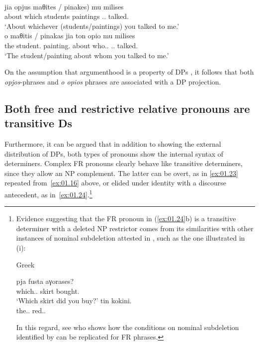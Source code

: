 \documentclass[output=paper]{langsci/langscibook}
\begin{document}
\ea {}\label{ex:01.21}\\
    \gll jia opjus \llap{(}maθites / pinakes) mu milises\\
        about which students {} paintings \Cl.\Fsg.\Gen{} talked.\Ssg{}\\
	\glt \enquote*{About whichever (students/paintings) you talked to me.}
\ex {}\label{ex:01.22}\\
	\gll o maθitis / pinakas jia {ton opio} mu milises\\
        the student.\Nom{} {} painting.\Nom{} about who.\Pl.\Acc{} \Cl.\Fsg.\Gen{} talked.\Ssg{}\\
	\glt \enquote*{The student/painting about whom you talked to me.}
\z

On the assumption that argumenthood is a property of DPs
\citep{Longobardi1994}, it follows that both \emph{opjos}-phrases and
\emph{o opios} phrases are associated with a DP projection.

\subsection{Both free and restrictive relative pronouns are transitive Ds}\label{sub:01.4.2}

Furthermore, it can be argued that in addition to showing the external
distribution of DPs, both types of pronouns show the internal syntax of
determiners. Complex \gls{FR} pronouns clearly behave like transitive
determiners, since they allow an NP complement. The latter can be overt, as in
\eqref{ex:01.23} repeated from~\eqref{ex:01.16} above, or elided under
identity with a discourse antecedent, as
in~\eqref{ex:01.24}.\footnote{Evidence suggesting that the \gls{FR} pronoun
    in (\ref{ex:01.24}b) is a transitive determiner with a deleted NP
    restrictor comes from its similarities with other instances of nominal
    subdeletion attested in , such as the one illustrated in (i):

\begin{exe}
     Greek
    \begin{xlist}
        \ex
		\gll pja fusta aγorases?\\
			which.\glossF.\Sg{} skirt bought.\Ssg{}\\
		\glt \enquote*{Which skirt did you buy?}
        \ex
		\gll tin kokini.\\
			the.\glossF.\Sg{} red.\glossF.\Sg{}\\
    \end{xlist}
\end{exe}

In this regard, see \citet{Daskalaki2009} who shows how the conditions on
nominal subdeletion identified by  \textcite{GiaSta1999} can be
replicated for \gls{FR} phrases.}
\end{document}

